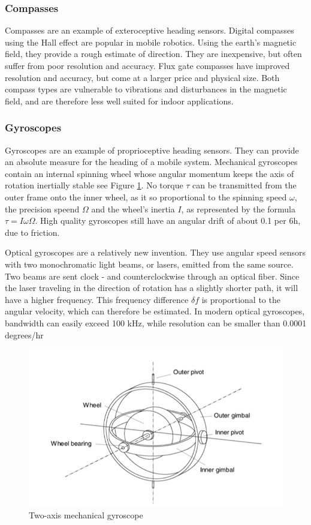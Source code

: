 \subsubsection{Compasses}
Compasses are an example of exteroceptive heading sensors. Digital compasses using the Hall effect are popular in mobile robotics. Using the earth's magnetic field, they provide a rough estimate of direction. They are inexpensive, but often suffer from poor resolution and accuracy. Flux gate compasses have improved resolution and accuracy, but come at a larger price and physical size. Both compass types are vulnerable to vibrations and disturbances in the magnetic field, and are therefore less well suited for indoor applications.

\subsubsection{Gyroscopes}
Gyroscopes are an example of proprioceptive heading sensors. They can provide an absolute measure for the heading of a mobile system. Mechanical gyroscopes contain an internal spinning wheel whose angular momentum keeps the axis of rotation inertially stable see Figure \ref{fig:gyro}. No torque $\tau$ can be transmitted from the outer frame onto the inner wheel, as it so proportional to the spinning speed $\omega$, the precision speend $\Omega$ and the wheel's inertia $I$, as represented by the formula $\tau = I\omega\Omega$. High quality gyroscopes still have an angular drift of about 0.1 per 6h, due to friction.

Optical gyroscopes are a relatively new invention. They use angular speed sensors with two monochromatic light beams, or lasers, emitted from the same source. Two beams are sent clock - and counterclockwise through an optical fiber. Since the laser traveling in the direction of rotation has a slightly shorter path, it will have a higher frequency. This frequency difference $\delta f$ is proportional to the angular velocity, which can therefore be estimated. In modern optical gyroscopes, bandwidth can easily exceed 100 kHz, while resolution can be smaller than 0.0001 degrees/hr



\begin{figure}[H]
\centering
        \includegraphics[width =8 cm]{gyro.png}
        \caption{Two-axis mechanical gyroscope \cite{SNS}}
        \label{fig:gyro}
\end{figure}





